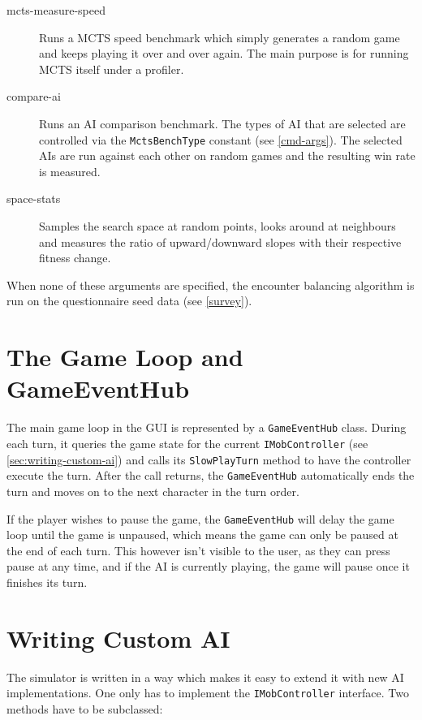\begin{description}
	\item[mcts-measure-speed] Runs a MCTS speed benchmark which simply generates a random game and keeps playing it over and over again. The main purpose is for running MCTS itself under a profiler.
	
	\item[compare-ai] Runs an AI comparison benchmark. The types of AI that are selected are controlled via the \verb|MctsBenchType| constant (see \autoref{cmd-args}). The selected AIs are run against each other on random games and the resulting win rate is measured.
	
	\item[space-stats] Samples the search space at random points, looks around at neighbours and measures the ratio of upward/downward slopes with their respective fitness change.
	
\end{description}

When none of these arguments are specified, the encounter balancing algorithm is run on the questionnaire seed data (see \autoref{survey}).

\section{The Game Loop and GameEventHub}

The main game loop in the GUI is represented by a \verb|GameEventHub| class. During each turn, it queries the game state for the current \verb|IMobController| (see \autoref{sec:writing-custom-ai}) and calls its \verb|SlowPlayTurn| method to have the controller execute the turn. After the call returns, the \verb|GameEventHub| automatically ends the turn and moves on to the next character in the turn order.

If the player wishes to pause the game, the \verb|GameEventHub| will delay the game loop until the game is unpaused, which means the game can only be paused at the end of each turn. This however isn't visible to the user, as they can press pause at any time, and if the AI is currently playing, the game will pause once it finishes its turn.

\section{Writing Custom AI}
\label{sec:writing-custom-ai}

The simulator is written in a way which makes it easy to extend it with new AI implementations. One only has to implement the \verb|IMobController| interface. Two methods have to be subclassed:

